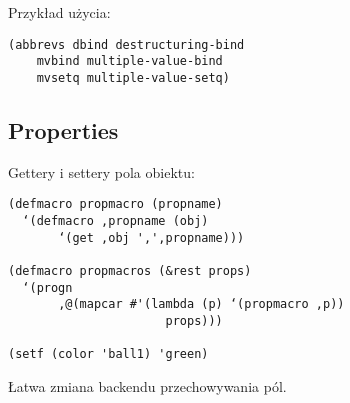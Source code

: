 \begin{frame}[fragile]{}
Przykład użycia:
\begin{verbatim}
(abbrevs dbind destructuring-bind
	mvbind multiple-value-bind
	mvsetq multiple-value-setq)
\end{verbatim}
\end{frame}

\subsection{Properties}
\begin{frame}[fragile]{}
Gettery i settery pola obiektu:
\begin{verbatim}
(defmacro propmacro (propname)
  ‘(defmacro ,propname (obj)
       ‘(get ,obj ',',propname)))

(defmacro propmacros (&rest props)
  ‘(progn
       ,@(mapcar #'(lambda (p) ‘(propmacro ,p))
                      props)))

(setf (color 'ball1) 'green)
\end{verbatim}
\pause
Łatwa zmiana backendu przechowywania pól.
\end{frame}

